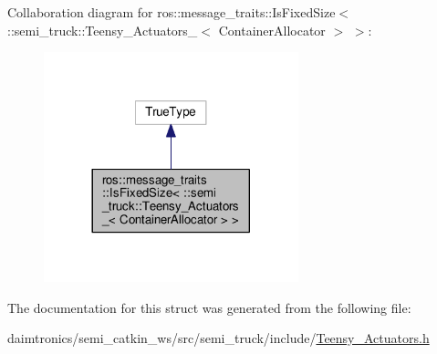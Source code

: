 Collaboration diagram for ros\+:\+:message\+\_\+traits\+:\+:Is\+Fixed\+Size$<$ \+:\+:semi\+\_\+truck\+:\+:Teensy\+\_\+\+Actuators\+\_\+$<$ Container\+Allocator $>$ $>$\+:\nopagebreak
\begin{figure}[H]
\begin{center}
\leavevmode
\includegraphics[width=209pt]{structros_1_1message__traits_1_1_is_fixed_size_3_01_1_1semi__truck_1_1_teensy___actuators___3_01837b0845e895ab918142d4b818f0d00e}
\end{center}
\end{figure}


The documentation for this struct was generated from the following file\+:\begin{DoxyCompactItemize}
\item 
daimtronics/semi\+\_\+catkin\+\_\+ws/src/semi\+\_\+truck/include/\hyperlink{_teensy___actuators_8h}{Teensy\+\_\+\+Actuators.\+h}\end{DoxyCompactItemize}

